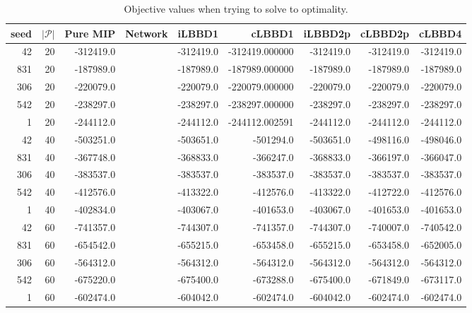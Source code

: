 \begin{table*}
    \centering
    \caption{Objective values when trying to solve to optimality.}
    \begin{tabular}{rrrrrrrrr} \toprule
        seed & $|\mathcal{P}|$ & Pure MIP & Network & iLBBD1 & cLBBD1 & iLBBD2p & cLBBD2p & cLBBD4 \\\midrule
  42      &      20         & -312419.0 &         & -312419.0 &-312419.000000 & -312419.0 & -312419.0 & -312419.0 \\
 831      &      20         & -187989.0  &        &-187989.0 & -187989.000000 & -187989.0 & -187989.0 &-187989.0 \\
  306      &      20       & -220079.0 &           &-220079.0 & -220079.000000 & -220079.0 & -220079.0 & -220079.0 \\
 542       &     20        & -238297.0 &          &-238297.0 & -238297.000000 & -238297.0 & -238297.0 & -238297.0 \\
    1      &      20       & -244112.0 &          &-244112.0 & -244112.002591 & -244112.0  & -244112.0 & -244112.0 \\\midrule
    42       &    40& -503251.0& &-503651.0& -501294.0& -503651.0& -498116.0& -498046.0 \\
    831     &       40& -367748.0&& -368833.0& -366247.0& -368833.0& -366197.0& -366047.0 \\
    306   &         40& -383537.0&& -383537.0& -383537.0& -383537.0& -383537.0& -383537.0 \\
    542   &         40& -412576.0&& -413322.0& -412576.0& -413322.0& -412722.0& -412576.0 \\
    1     &       40& -402834.0&& -403067.0& -401653.0& -403067.0& -401653.0& -401653.0 \\\midrule
    42     &       60 &-741357.0&& -744307.0& -741357.0 &-744307.0& -740007.0& -740542.0 \\
    831   &         60& -654542.0&& -655215.0& -653458.0& -655215.0& -653458.0 &-652005.0\\
    306    &        60& -564312.0&& -564312.0& -564312.0 &-564312.0& -564312.0& -564312.0\\
    542     &       60& -675220.0&& -675400.0& -673288.0& -675400.0& -671849.0& -673117.0\\
    1       &     60 &-602474.0&& -604042.0& -602474.0& -604042.0 &-602474.0& -602474.0\\
    \bottomrule
    \end{tabular}
\end{table*}
